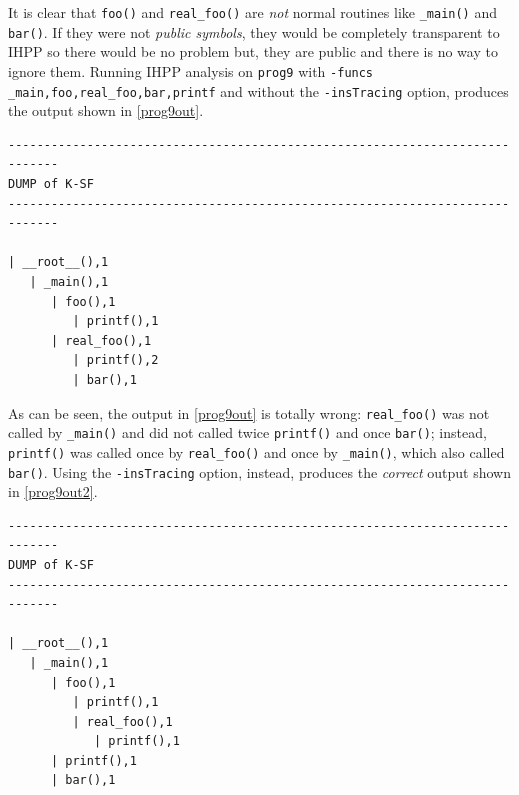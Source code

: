 \documentclass[a4paper,10pt]{report}
\begin{document}
\noindent
It is clear that \verb|foo()| and \verb|real_foo()| are \emph{not} normal routines
like \verb|_main()| and \verb|bar()|. 
If they were not \emph{public symbols}, they would be completely transparent to IHPP 
so there would be no problem but, they are public and there is no way to ignore them.
Running IHPP analysis on \verb|prog9| with \verb|-funcs| \verb|_main,foo,real_foo,bar,printf| and without the \verb|-insTracing| option, produces the output shown in \cref{prog9out}.
\begin{lstlisting}[label=prog9out, caption={IHPP output without \emph{insTracing}}, frame=leftline, showstringspaces=false]
-----------------------------------------------------------------------------
DUMP of K-SF
-----------------------------------------------------------------------------

| __root__(),1
   | _main(),1
      | foo(),1
         | printf(),1
      | real_foo(),1
         | printf(),2
         | bar(),1
\end{lstlisting}

\noindent
As can be seen, the output in \cref{prog9out} is totally wrong: 
\verb|real_foo()| was not called by \verb|_main()| and did not called twice \verb|printf()|
and once \verb|bar()|; instead, \verb|printf()| was called once by \verb|real_foo()|
and once by \verb|_main()|, which also called \verb|bar()|.
Using the \verb|-insTracing| option, instead, produces the \emph{correct} output
shown in \cref{prog9out2}.

\begin{lstlisting}[label=prog9out2, caption={IHPP output with \emph{insTracing}}, frame=leftline, showstringspaces=false]
-----------------------------------------------------------------------------
DUMP of K-SF
-----------------------------------------------------------------------------

| __root__(),1
   | _main(),1
      | foo(),1
         | printf(),1
         | real_foo(),1
            | printf(),1
      | printf(),1
      | bar(),1
\end{lstlisting}
\end{document}
